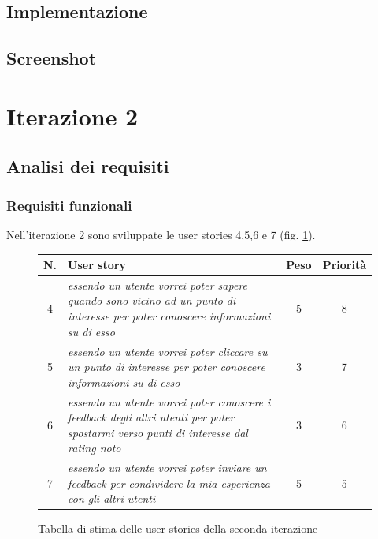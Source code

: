 \subsection{Implementazione}

\subsection{Screenshot}





\clearpage

\section{Iterazione 2}

\subsection{Analisi dei requisiti}

\subsubsection{Requisiti funzionali}
Nell'iterazione 2 sono sviluppate le user stories 4,5,6 e 7 (fig. \ref{userstoriestablesecondaiterazione}). 
\begin{figure}
\begin{center}
\begin{tabular}[c]{|c|p{7cm}|c|c|}
\hline
N. & User story & Peso & Priorità\\
\hline
4 & \textit{essendo un utente vorrei poter sapere quando sono vicino ad un punto di interesse per poter conoscere informazioni su di esso} & 5 & 8\\
\hline
5 & \textit{essendo un utente vorrei poter cliccare su un punto di interesse per poter conoscere informazioni su di esso} & 3 & 7\\
\hline
6 & \textit{essendo un utente vorrei poter conoscere i feedback degli altri utenti per poter spostarmi verso punti di interesse dal rating noto} & 3 & 6\\
\hline
7 & \textit{essendo un utente vorrei poter inviare un feedback per condividere la mia esperienza con gli altri utenti} & 5 & 5\\
\hline
\end{tabular}
\caption{Tabella di stima delle user stories della seconda iterazione\label{userstoriestablesecondaiterazione}}
\end{center}
\end{figure}

